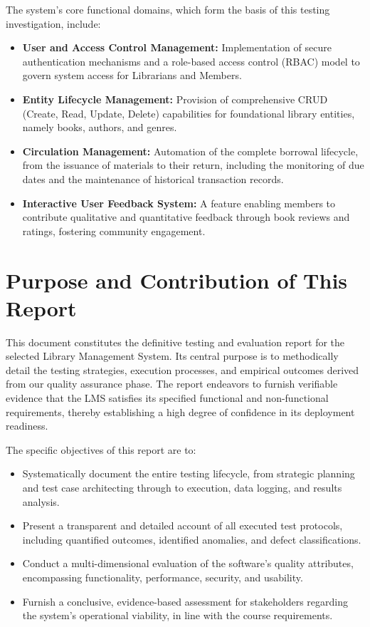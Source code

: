 The system's core functional domains, which form the basis of this testing investigation, include:
\begin{itemize}
    \item \textbf{User and Access Control Management:} Implementation of secure authentication mechanisms and a role-based access control (RBAC) model to govern system access for Librarians and Members.
    \item \textbf{Entity Lifecycle Management:} Provision of comprehensive CRUD (Create, Read, Update, Delete) capabilities for foundational library entities, namely books, authors, and genres.
    \item \textbf{Circulation Management:} Automation of the complete borrowal lifecycle, from the issuance of materials to their return, including the monitoring of due dates and the maintenance of historical transaction records.
    \item \textbf{Interactive User Feedback System:} A feature enabling members to contribute qualitative and quantitative feedback through book reviews and ratings, fostering community engagement.
\end{itemize}

\section{Purpose and Contribution of This Report}
\label{sec:report_purpose}
This document constitutes the definitive testing and evaluation report for the selected Library Management System. Its central purpose is to methodically detail the testing strategies, execution processes, and empirical outcomes derived from our quality assurance phase. The report endeavors to furnish verifiable evidence that the LMS satisfies its specified functional and non-functional requirements, thereby establishing a high degree of confidence in its deployment readiness.

The specific objectives of this report are to:
\begin{itemize}
    \item Systematically document the entire testing lifecycle, from strategic planning and test case architecting through to execution, data logging, and results analysis.
    \item Present a transparent and detailed account of all executed test protocols, including quantified outcomes, identified anomalies, and defect classifications.
    \item Conduct a multi-dimensional evaluation of the software's quality attributes, encompassing functionality, performance, security, and usability.
    \item Furnish a conclusive, evidence-based assessment for stakeholders regarding the system's operational viability, in line with the course requirements.
\end{itemize}

